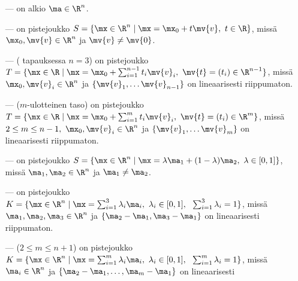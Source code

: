 \begin{itemize}
\item[---]  on alkio $\ma \in \R^n$. 
\item[---]  on pistejoukko 
           $S = \{\mx \in \R^n \mid \mx = \mx_0 + t\mv{v},\ t \in \R\}$, missä \\ 
           $\mx_0,\mv{v} \in \R^n$ ja $\mv{v} \neq \mv{0}$.
\item[---]  ( tapauksessa $n=3$) on pistejoukko \\
           $T = \{\mx \in \R \mid \mx = \mx_0 + \sum_{i=1}^{n-1} t_i \mv{v}_i,\ \mv{t} 
              = (t_i) \in \R^{n-1}\}$, missä \\
           $\mx_0,\mv{v}_i \in \R^n$ ja $\{\mv{v}_1, \ldots \mv{v}_{n-1}\}$ on lineaarisesti 
           riippumaton.  
\item[---]  ($m$-ulotteinen taso) on pistejoukko \\
           $T = \{\mx \in \R \mid \mx = \mx_0 + \sum_{i=1}^{m} t_i \mv{v}_i,\ \mv{t} 
              = (t_i) \in \R^m\}$, missä \\
           $2 \le m \le n-1,\ \mx_0,\mv{v}_i \in \R^n$ ja $\{\mv{v}_1, \ldots \mv{v}_m\}$ on 
           lineaarisesti riippumaton.
\item[---]   on pistejoukko 
           $S = \{\mx \in \R^n \mid \mx 
              = \lambda\ma_1 + (1-\lambda)\ma_2,\ \lambda \in [0,1]\}$, \\
           missä $\ma_1,\ma_2 \in \R^n$ ja $\ma_1 \neq \ma_2$. 
\item[---]  on pistejoukko \\
           $K = \{\mx \in \R^n \mid \mx = \sum_{i=1}^3 \lambda_i \ma_i,\ 
                             \lambda_i \in [0,1],\ \ \sum_{i=1}^3 \lambda_i = 1\}$, missä \\
           $\ma_1,\ma_2,\ma_3 \in \R^n$ ja $\{\ma_2-\ma_1,\ma_3-\ma_1\}$ on lineaarisesti 
           riippumaton. \index{kolmio ($\R^n$:n)}
\item[---]  ($2 \le m \le n+1$) on pistejoukko \\
           $K = \{\mx \in \R^n \mid \mx 
              = \sum_{i=1}^m \lambda_i \ma_i,\ \lambda_i \in [0,1],\ \ 
                \sum_{i=1}^m \lambda_i = 1\}$, missä \\
           $\ma_i \in \R^n$ ja $\{\ma_2-\ma_1, \ldots, \ma_m-\ma_1\}$ on lineaarisesti 

\end{itemize}
